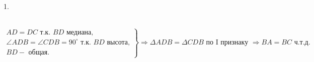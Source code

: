 1. \begin{figure}[ht!]
\end{figure}\\
$\left.\begin{array}{l}AD=DC\text{ т.к. }BD\text{ медиана,}\\
\angle ADB=\angle CDB=90^\circ \text{ т.к. }BD\text{ высота,}\\
BD - \text{ общая.}   \end{array}\right\}\Rightarrow
\Delta ADB=\Delta CDB\text{ по I признаку }\Rightarrow BA=BC\text{ ч.т.д.} $\\
